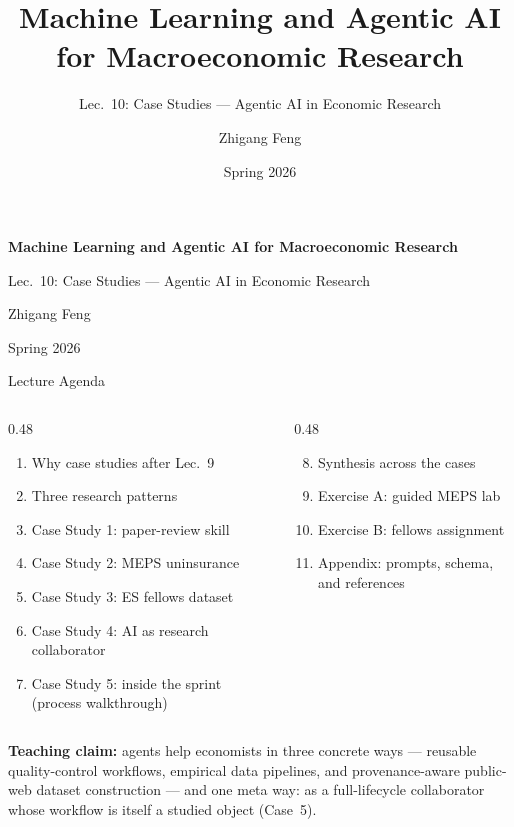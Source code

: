 \documentclass[10pt,english,aspectratio=169]{beamer}
\title[ML \& Agentic AI for Macro Research]{Machine Learning and Agentic AI for Macroeconomic Research}
\subtitle{Lec.~10: Case Studies --- Agentic AI in Economic Research}
\author{Zhigang Feng}
\date{Spring 2026}
\begin{document}
\begin{frame}[plain]
\begin{center}
\vspace{1.2cm}
{\Large\textbf{Machine Learning and Agentic AI for Macroeconomic Research}\par}
\vspace{0.35cm}
{\large Lec.~10: Case Studies --- Agentic AI in Economic Research\par}
\vspace{0.8cm}
{\normalsize Zhigang Feng\par}
\vspace{0.1cm}
{\normalsize Spring 2026\par}
\end{center}
\end{frame}

\begin{frame}{Lecture Agenda}
\begin{columns}[T]
\begin{column}{0.48\textwidth}
\begin{enumerate}
    \item Why case studies after Lec.~9
    \item Three research patterns
    \item Case Study 1: paper-review skill
    \item Case Study 2: MEPS uninsurance
    \item Case Study 3: ES fellows dataset
    \item Case Study 4: AI as research collaborator
    \item Case Study 5: inside the sprint (process walkthrough)
\end{enumerate}
\end{column}
\begin{column}{0.48\textwidth}
\begin{enumerate}
    \setcounter{enumi}{7}
    \item Synthesis across the cases
    \item Exercise A: guided MEPS lab
    \item Exercise B: fellows assignment
    \item Appendix: prompts, schema, and references
\end{enumerate}
\end{column}
\end{columns}

\vspace{0.3cm}
\textbf{Teaching claim:} agents help economists in three concrete ways ---
reusable quality-control workflows, empirical data pipelines, and provenance-aware public-web dataset construction --- and one meta way: as a full-lifecycle collaborator whose workflow is itself a studied object (Case~5).
\end{frame}
\end{document}
